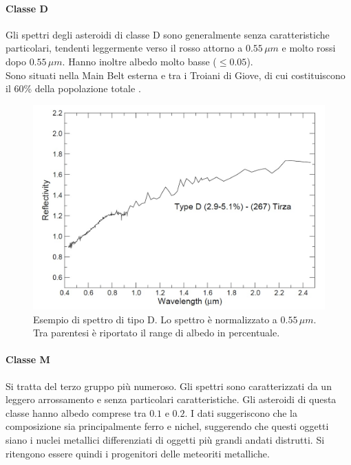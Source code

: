 \documentclass[a4paper,11pt,openright]{book}
\begin{document}
\paragraph*{Classe D}
Gli spettri degli asteroidi di classe D sono generalmente senza caratteristiche particolari, tendenti leggermente verso il rosso attorno a $0.55\,\mu m$ e molto rossi dopo $0.55\,\mu m$. Hanno inoltre albedo molto basse ($\leq 0.05$).\\
Sono situati nella Main Belt esterna e tra i Troiani di Giove, di cui costituiscono il 60\% della popolazione totale \citep{VILAS1985503}.

\begin{figure}[!h]
    \centering
    \includegraphics[scale=0.3]{figure/spettro_d.jpg}
    \caption[Esempio di spettro di tipo D.]{Esempio di spettro di tipo D. Lo spettro è normalizzato a $0.55\,\mu m$. Tra parentesi è riportato il range di albedo in percentuale. \citep{magrin_spectroscopic_nodate}}
    \label{spettro_d}
\end{figure}

\paragraph*{Classe M}
Si tratta del terzo gruppo più numeroso. Gli spettri sono caratterizzati da un leggero arrossamento e senza particolari caratteristiche. Gli asteroidi di questa classe hanno albedo comprese tra $0.1$ e $0.2$. I dati suggeriscono che la composizione sia principalmente ferro e nichel, suggerendo che questi oggetti siano i nuclei metallici differenziati di oggetti più grandi andati distrutti. Si ritengono essere quindi i progenitori delle meteoriti metalliche.
\end{document}
